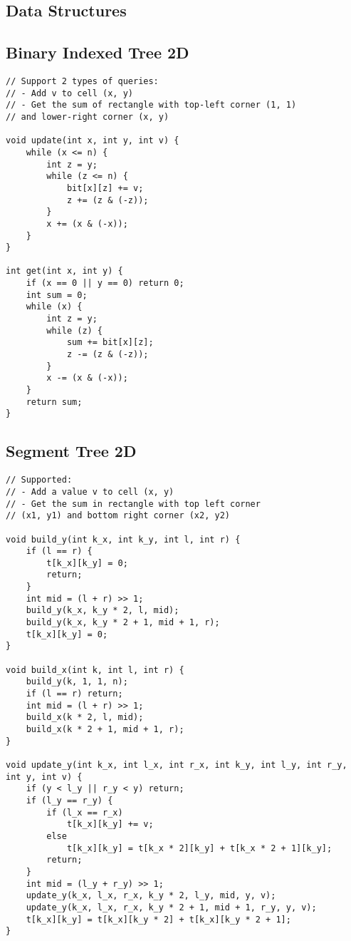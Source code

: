 \documentclass[10pt,landscape]{article}
\begin{document}
\begin{multicols}{2}
\section{Data Structures}
\subsection{Binary Indexed Tree 2D}
\begin{lstlisting}
// Support 2 types of queries:
// - Add v to cell (x, y)
// - Get the sum of rectangle with top-left corner (1, 1) 
// and lower-right corner (x, y)

void update(int x, int y, int v) {
    while (x <= n) {
        int z = y;
        while (z <= n) {
            bit[x][z] += v;
            z += (z & (-z));
        }
        x += (x & (-x));
    }
}

int get(int x, int y) {
    if (x == 0 || y == 0) return 0;
    int sum = 0;
    while (x) {
        int z = y;
        while (z) {
            sum += bit[x][z];
            z -= (z & (-z));
        }
        x -= (x & (-x));
    }
    return sum;
}
\end{lstlisting}
\subsection{Segment Tree 2D}
\begin{lstlisting}
// Supported:
// - Add a value v to cell (x, y)
// - Get the sum in rectangle with top left corner 
// (x1, y1) and bottom right corner (x2, y2)

void build_y(int k_x, int k_y, int l, int r) {
    if (l == r) { 
        t[k_x][k_y] = 0; 
        return;
    }
    int mid = (l + r) >> 1;
    build_y(k_x, k_y * 2, l, mid);
    build_y(k_x, k_y * 2 + 1, mid + 1, r);
    t[k_x][k_y] = 0;
}

void build_x(int k, int l, int r) {
    build_y(k, 1, 1, n);
    if (l == r) return;
    int mid = (l + r) >> 1;
    build_x(k * 2, l, mid);
    build_x(k * 2 + 1, mid + 1, r);
}

void update_y(int k_x, int l_x, int r_x, int k_y, int l_y, int r_y, int y, int v) {
    if (y < l_y || r_y < y) return;
    if (l_y == r_y) {
        if (l_x == r_x)
            t[k_x][k_y] += v;
        else
            t[k_x][k_y] = t[k_x * 2][k_y] + t[k_x * 2 + 1][k_y];
        return;
    }
    int mid = (l_y + r_y) >> 1;
    update_y(k_x, l_x, r_x, k_y * 2, l_y, mid, y, v);
    update_y(k_x, l_x, r_x, k_y * 2 + 1, mid + 1, r_y, y, v);
    t[k_x][k_y] = t[k_x][k_y * 2] + t[k_x][k_y * 2 + 1];
}


\end{lstlisting}
\end{multicols}
\end{document}
